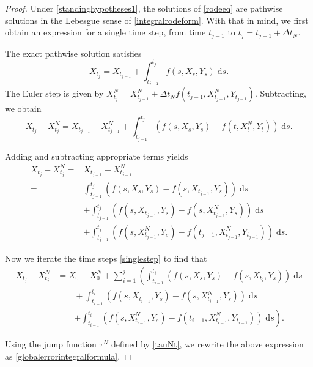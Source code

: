 \documentclass[reqno,12pt]{amsart}
\theoremstyle{plain} %
\theoremstyle{definition} %
\begin{document}
\begin{proof}
    Under \cref{standinghypotheses1}, the solutions of \eqref{rodeeq} are pathwise solutions in the Lebesgue sense of \eqref{integralrodeform}. With that in mind, we first obtain an expression for a single time step, from time $t_{j-1}$ to $t_j = t_{j-1} + \Delta t_N$.
    
    The exact pathwise solution satisfies
    $$
    X_{t_j} = X_{t_{j-1}} + \int_{t_{j-1}}^{t_j} f(s, X_s, Y_s) \;\mathrm{d}s.
    $$
    The Euler step is given by $X_{t_j}^N = X_{t_{j-1}}^N + \Delta t_N f(t_{j-1}, X_{t_{j-1}}^N, Y_{t_{j-1}}).$ Subtracting, we obtain
    $$
    X_{t_j} - X_{t_j}^N = X_{t_{j-1}} - X_{t_{j-1}}^N + \int_{t_{j-1}}^{t_j} \left( f(s, X_s, Y_s) - f(t, X_t^N, Y_t) \right)\;\mathrm{d}s.
    $$

    Adding and subtracting appropriate terms yields
    \begin{equation}
        \label{singlestep}
        \begin{aligned}
            X_{t_j} - X_{t_j}^N  = & X_{t_{j-1}} - X_{t_{j-1}}^N \\
            = &  \int_{t_{j-1}}^{t_j} \left( f(s, X_s, Y_s) - f(s, X_{t_{j-1}}, Y_s) \right)\;\mathrm{d}s \\ 
            & + \int_{t_{j-1}}^{t_j} \left( f(s, X_{t_{j-1}}, Y_s) - f(s, X_{t_{j-1}}^N, Y_s) \right)\;\mathrm{d}s \\
            & + \int_{t_{j-1}}^{t_j} \left( f(s, X_{t_{j-1}}^N, Y_s) - f(t_{j-1}, X_{t_{j-1}}^N, Y_{t_{j-1}}) \right)\;\mathrm{d}s.
        \end{aligned}
    \end{equation}

    Now we iterate the time steps \eqref{singlestep} to find that
    \begin{align*}
        X_{t_j} - X_{t_j}^N & = X_0 - X_0^N + \sum_{i=1}^{j} \left(\int_{t_{i-1}}^{t_i} \left( f(s, X_s, Y_s) - f(s, X_{t_{i}}, Y_s) \right)\;\mathrm{d}s \right. \\ 
        & \qquad + \int_{t_{i-1}}^{t_i} \left( f(s, X_{t_{i-1}}, Y_s) - f(s, X_{t_{i-1}}^N, Y_s) \right)\;\mathrm{d}s \\
        & \qquad \left. + \int_{t_{i-1}}^{t_i} \left( f(s, X_{t_{i-1}}^N, Y_s) - f(t_{i-1}, X_{t_{i-1}}^N, Y_{t_{i-1}}) \right)\;\mathrm{d}s \right).
    \end{align*}

    Using the jump function $\tau^N$ defined by \eqref{tauNt}, we rewrite the above expression as \eqref{globalerrorintegralformula}.
\end{proof}
\end{document}
